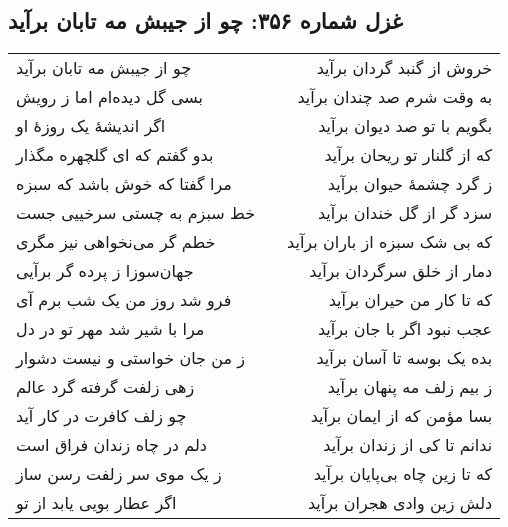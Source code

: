 \begin{center}
\section*{غزل شماره ۳۵۶: چو از جیبش مه تابان برآید}
\label{sec:356}
\begin{longtable}{l p{0.5cm} r}
چو از جیبش مه تابان برآید
&&
خروش از گنبد گردان برآید
\\
بسی گل دیده‌ام اما ز رویش
&&
به وقت شرم صد چندان برآید
\\
اگر اندیشهٔ یک روزهٔ او
&&
بگویم با تو صد دیوان برآید
\\
بدو گفتم که ای گلچهره مگذار
&&
که از گلنار تو ریحان برآید
\\
مرا گفتا که خوش باشد که سبزه
&&
ز گرد چشمهٔ حیوان برآید
\\
خط سبزم به چستی سرخییی جست
&&
سزد گر از گل خندان برآید
\\
خطم گر می‌نخواهی نیز مگری
&&
که بی شک سبزه از باران برآید
\\
جهان‌سوزا ز پرده گر برآیی
&&
دمار از خلق سرگردان برآید
\\
فرو شد روز من یک شب برم آی
&&
که تا کار من حیران برآید
\\
مرا با شیر شد مهر تو در دل
&&
عجب نبود اگر با جان برآید
\\
ز من جان خواستی و نیست دشوار
&&
بده یک بوسه تا آسان برآید
\\
زهی زلفت گرفته گرد عالم
&&
ز بیم زلف مه پنهان برآید
\\
چو زلف کافرت در کار آید
&&
بسا مؤمن که از ایمان برآید
\\
دلم در چاه زندان فراق است
&&
ندانم تا کی از زندان برآید
\\
ز یک موی سر زلفت رسن ساز
&&
که تا زین چاه بی‌پایان برآید
\\
اگر عطار بویی یابد از تو
&&
دلش زین وادی هجران برآید
\\
\end{longtable}
\end{center}
